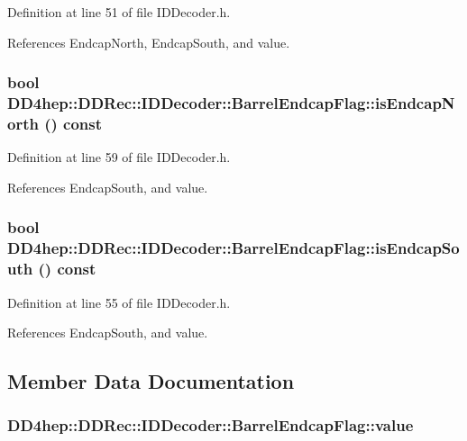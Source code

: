 Definition at line 51 of file IDDecoder.h.

References EndcapNorth, EndcapSouth, and value.\hypertarget{class_d_d4hep_1_1_d_d_rec_1_1_i_d_decoder_1_1_barrel_endcap_flag_a15053aeb2df9da99f106b3c38d54c6b7}{
\subsubsection[{isEndcapNorth}]{\setlength{\rightskip}{0pt plus 5cm}bool DD4hep::DDRec::IDDecoder::BarrelEndcapFlag::isEndcapNorth () const}}
\label{class_d_d4hep_1_1_d_d_rec_1_1_i_d_decoder_1_1_barrel_endcap_flag_a15053aeb2df9da99f106b3c38d54c6b7}


Definition at line 59 of file IDDecoder.h.

References EndcapSouth, and value.\hypertarget{class_d_d4hep_1_1_d_d_rec_1_1_i_d_decoder_1_1_barrel_endcap_flag_aa33d11a4be4d117089ed62084ff1dc89}{
\subsubsection[{isEndcapSouth}]{\setlength{\rightskip}{0pt plus 5cm}bool DD4hep::DDRec::IDDecoder::BarrelEndcapFlag::isEndcapSouth () const}}
\label{class_d_d4hep_1_1_d_d_rec_1_1_i_d_decoder_1_1_barrel_endcap_flag_aa33d11a4be4d117089ed62084ff1dc89}


Definition at line 55 of file IDDecoder.h.

References EndcapSouth, and value.

\subsection{Member Data Documentation}
\hypertarget{class_d_d4hep_1_1_d_d_rec_1_1_i_d_decoder_1_1_barrel_endcap_flag_a7521612ff515aea981e4136b33d7b06e}{
\subsubsection[{value}]{ {\bf DD4hep::DDRec::IDDecoder::BarrelEndcapFlag::value}}}
\label{class_d_d4hep_1_1_d_d_rec_1_1_i_d_decoder_1_1_barrel_endcap_flag_a7521612ff515aea981e4136b33d7b06e}


